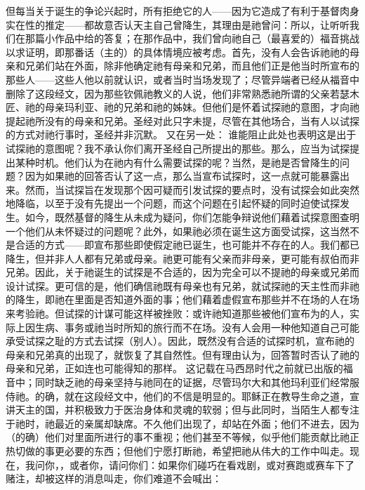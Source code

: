 但每当关于诞生的争论兴起时，所有拒绝它的人——因为它造成了有利于基督肉身实在性的推定——都故意否认天主自己曾降生，其理由是祂曾问：所以，让听听我们在那篇小作品中给的答复；在那作品中，我们曾向祂自己（最喜爱的）福音挑战以求证明，即那番话（主的）的具体情境应被考虑。首先，没有人会告诉祂祂的母亲和兄弟们站在外面，除非他确定祂有母亲和兄弟，而且他们正是他当时所宣布的那些人——这些人他以前就认识，或者当时当场发现了；尽管异端者已经从福音中删除了这段经文，因为那些钦佩祂教义的人说，他们非常熟悉祂所谓的父亲若瑟木匠、祂的母亲玛利亚、祂的兄弟和祂的姊妹。但他们是怀着试探祂的意图，才向祂提起祂所没有的母亲和兄弟。圣经对此只字未提，尽管在其他场合，当有人以试探的方式对祂行事时，圣经并非沉默。  又在另一处： 谁能阻止此处也表明这是出于试探祂的意图呢？我不承认你们离开圣经自己所提出的那些。那么，应当为试探提出某种时机。他们认为在祂内有什么需要试探的呢？当然，是祂是否曾降生的问题？因为如果祂的回答否认了这一点，那么当宣布试探时，这一点就可能暴露出来。然而，当试探旨在发现那个因可疑而引发试探的要点时，没有试探会如此突然地降临，以至于没有先提出一个问题，而这个问题在引起怀疑的同时迫使试探发生。如今，既然基督的降生从未成为疑问，你们怎能争辩说他们藉着试探意图查明一个他们从未怀疑过的问题呢？此外，如果祂必须在诞生这方面受试探，这当然不是合适的方式——即宣布那些即使假定祂已诞生，也可能并不存在的人。我们都已降生，但并非人人都有兄弟或母亲。祂更可能有父亲而非母亲，更可能有叔伯而非兄弟。因此，关于祂诞生的试探是不合适的，因为完全可以不提祂的母亲或兄弟而设计试探。更可信的是，他们确信祂既有母亲也有兄弟，就试探祂的天主性而非祂的降生，即祂在里面是否知道外面的事；他们藉着虚假宣布那些并不在场的人在场来考验祂。但试探的计谋可能这样被挫败：或许祂知道那些被他们宣布为的人，实际上因生病、事务或祂当时所知的旅行而不在场。没有人会用一种他知道自己可能承受试探之耻的方式去试探（别人）。因此，既然没有合适的试探时机，宣布祂的母亲和兄弟真的出现了，就恢复了其自然性。但有理由认为，回答暂时否认了祂的母亲和兄弟，正如连也可能得知的那样。  这记载在马西昂时代之前就已出版的福音中；同时缺乏祂的母亲坚持与祂同在的证据，尽管玛尔大和其他玛利亚们经常服侍祂。的确，就在这段经文中，他们的不信是明显的。耶稣正在教导生命之道，宣讲天主的国，并积极致力于医治身体和灵魂的软弱；但与此同时，当陌生人都专注于祂时，祂最近的亲属却缺席。不久他们出现了，却站在外面；他们不进去，因为（的确）他们对里面所进行的事不重视；他们甚至不等候，似乎他们能贡献比祂正热切做的事更必要的东西；但他们宁愿打断祂，希望把祂从伟大的工作中叫走。现在，我问你，，或者你，请问你们：如果你们碰巧在看戏剧，或对赛跑或赛车下了赌注，却被这样的消息叫走，你们难道不会喊出： 